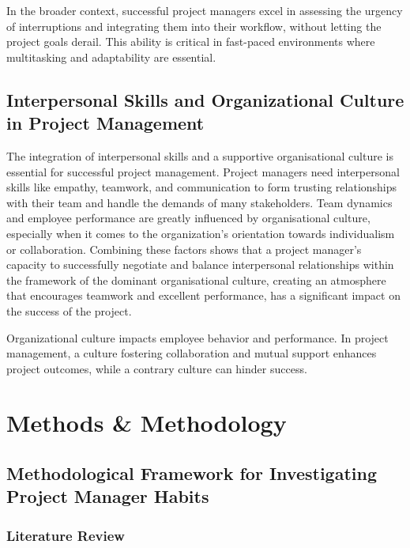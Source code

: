 \documentclass{article}
\begin{document}
In the broader context, successful project managers excel in assessing the urgency of interruptions and integrating them into their workflow, without letting the project goals derail. This ability is critical in fast-paced environments where multitasking and adaptability are essential. \cite{mordu2016managing}

\subsection{Interpersonal Skills and Organizational Culture in Project Management}
The integration of interpersonal skills and a supportive organisational culture is essential for successful project management. Project managers need interpersonal skills like empathy, teamwork, and communication to form trusting relationships with their team and handle the demands of many stakeholders. Team dynamics and employee performance are greatly influenced by organisational culture, especially when it comes to the organization's orientation towards individualism or collaboration. Combining these factors shows that a project manager's capacity to successfully negotiate and balance interpersonal relationships within the framework of the dominant organisational culture, creating an atmosphere that encourages teamwork and excellent performance, has a significant impact on the success of the project. \cite{nusari2018impact}

Organizational culture impacts employee behavior and performance. In project management, a culture fostering collaboration and mutual support enhances project outcomes, while a contrary culture can hinder success.


\section{Methods \& Methodology}

\subsection{Methodological Framework for Investigating Project Manager Habits}

\subsubsection{Literature Review}
\end{document}
